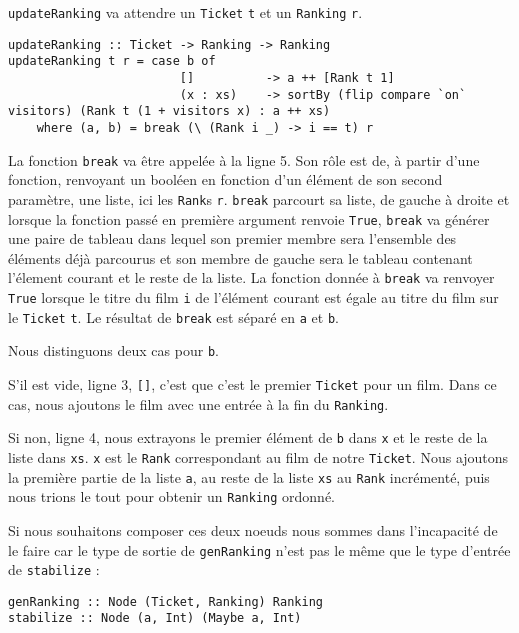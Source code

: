 \documentclass{llncs}
\begin{document}
\lstinline{updateRanking} va attendre un \lstinline{Ticket} \lstinline{t} et un
\lstinline{Ranking} \lstinline{r}.
\begin{lstlisting}
updateRanking :: Ticket -> Ranking -> Ranking
updateRanking t r = case b of
                        []          -> a ++ [Rank t 1]
                        (x : xs)    -> sortBy (flip compare `on` visitors) (Rank t (1 + visitors x) : a ++ xs)
    where (a, b) = break (\ (Rank i _) -> i == t) r
\end{lstlisting}
La fonction \lstinline{break} va être appelée à la ligne 5.
Son rôle est de, à partir d'une fonction, renvoyant un booléen en fonction d'un
élément de son second paramètre, une liste, ici les \lstinline{Rank}s \lstinline{r}.
\lstinline{break} parcourt sa liste, de gauche à droite et lorsque la fonction passé
en première argument renvoie \lstinline{True}, \lstinline{break} va générer une
paire de tableau dans lequel son premier membre sera l'ensemble des éléments déjà
parcourus et son membre de gauche sera le tableau contenant l'élement courant et
le reste de la liste.
La fonction donnée à \lstinline{break} va renvoyer \lstinline{True} lorsque le titre
du film \lstinline{i} de l'élément courant est égale au titre du film sur le
\lstinline{Ticket} \lstinline{t}.
Le résultat de \lstinline{break} est séparé en \lstinline{a} et \lstinline{b}.

Nous distinguons deux cas pour \lstinline{b}.

S'il est vide, ligne 3, \lstinline{[]}, c'est que c'est le premier \lstinline{Ticket}
pour un film.
Dans ce cas, nous ajoutons le film avec une entrée à la fin du \lstinline{Ranking}.

Si non, ligne 4, nous extrayons le premier élément de \lstinline{b} dans \lstinline{x}
et le reste de la liste dans \lstinline{xs}.
\lstinline{x} est le \lstinline{Rank} correspondant au film de notre \lstinline{Ticket}.
Nous ajoutons la première partie de la liste \lstinline{a}, au reste de la liste
\lstinline{xs} au \lstinline{Rank} incrémenté, puis nous trions le tout pour obtenir
un \lstinline{Ranking} ordonné.

Si nous souhaitons composer ces deux noeuds nous sommes dans l'incapacité de le
faire car le type de sortie de \lstinline{genRanking} n'est pas le même que le
type d'entrée de \lstinline{stabilize} :
\begin{lstlisting}
genRanking :: Node (Ticket, Ranking) Ranking
stabilize :: Node (a, Int) (Maybe a, Int)
\end{lstlisting}
\end{document}
